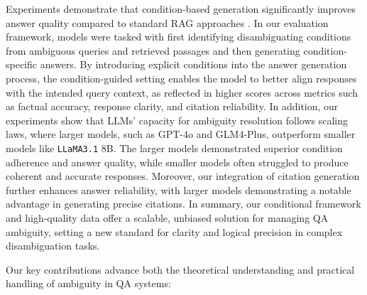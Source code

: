 Experiments demonstrate that condition-based generation significantly improves answer quality compared to standard RAG approaches \cite{lewis2020retrieval}. In our evaluation framework, models were tasked with first identifying disambiguating conditions from ambiguous queries and retrieved passages and then generating condition-specific answers. By introducing explicit conditions into the answer generation process, the condition-guided setting enables the model to better align responses with the intended query context, as reflected in higher scores across metrics such as factual accuracy, response clarity, and citation reliability. In addition, our experiments show that LLMs’ capacity for ambiguity resolution follows scaling laws, where larger models, such as GPT-4o and GLM4-Plus, outperform smaller models like \texttt{LLaMA3.1} 8B. The larger models demonstrated superior condition adherence and answer quality, while smaller models often struggled to produce coherent and accurate responses. Moreover, our integration of citation generation further enhances answer reliability, with larger models demonstrating a notable advantage in generating precise citations. In summary, our conditional framework and high-quality data offer a scalable, unbiased solution for managing QA ambiguity, setting a new standard for clarity and logical precision in complex disambiguation tasks.


Our key contributions advance both the theoretical understanding and practical handling of ambiguity in QA systems:

